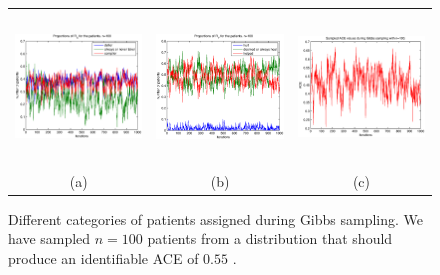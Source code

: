 \documentclass[a4paper, 10pt]{article}
\begin{document}
\begin{figure}
\begin{tabular}{ccc}
 \includegraphics[width=4.5cm,height=4cm,bb=103 240 500
555]{takingtype_case0.55_n=100.eps} &
 \includegraphics[width=4.5cm,height=4cm,bb=103 240 500 555]
{healingtype_case0.55_n=100.eps} &
 \includegraphics[width=4.5cm,height=4cm,bb=103 240
500 555]{sampledACEs_case0.55_n=100.eps} \\
(a) & (b) & (c)
\end{tabular}
\caption{Different categories of patients assigned during Gibbs sampling. We
have sampled $n=100$ patients from a distribution that should produce an
identifiable ACE of $0.55$ .}
\label{fig:n=100_case0.55}
\end{figure}
\end{document}
